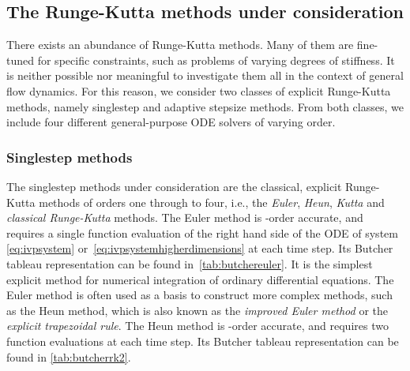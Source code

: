 \subsection{The Runge-Kutta methods under consideration}
\label{sub:the_runge_kutta_methods_under_consideration}

There exists an abundance of Runge-Kutta methods. Many of them are
fine-tuned for specific constraints, such as problems of varying degrees of
stiffness. It is neither possible nor meaningful to investigate them all
in the context of general flow dynamics. For this reason, we consider two classes
of explicit Runge-Kutta methods, namely singlestep and adaptive stepsize
methods. From both classes, we include four different general-purpose ODE solvers
of varying order.

\subsubsection{Singlestep methods}
\label{ssub:singlestep_methods}

The singlestep methods under consideration are the classical, explicit
Runge-Kutta methods of orders one through to four, i.e., the \emph{Euler},
\emph{Heun}, \emph{Kutta} and \emph{classical Runge-Kutta} methods. The
Euler method is -order accurate, and requires a single function
evaluation of the right hand side of the ODE of system
\eqref{eq:ivpsystem} or~\eqref{eq:ivpsystemhigherdimensions} at each time step.
Its Butcher tableau representation can be found in~\cref{tab:butchereuler}.
It is the simplest explicit method for numerical integration of ordinary
differential equations. The Euler method is often used as a basis to construct
more complex methods, such as the Heun method, which is also known as the
\emph{improved Euler method} or the \emph{explicit trapezoidal rule}. The Heun
method is -order accurate, and requires two function evaluations at each
time step. Its Butcher tableau representation can be found in
\cref{tab:butcherrk2}.


\clearpage


